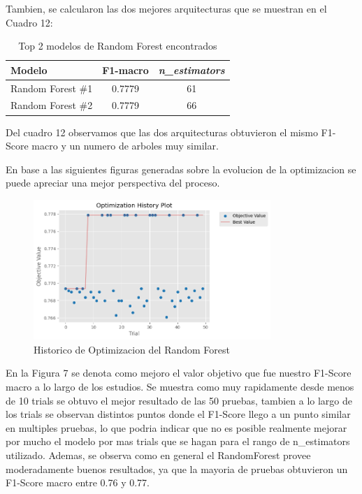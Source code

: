 \documentclass[12pt,a4paper]{article}
\begin{document}
Tambien, se calcularon las dos mejores arquitecturas que se muestran en el Cuadro 12:

\begin{table}[htbp]
  \centering
  \begin{tabular}{lcc}
    \hline
    Modelo & F1-macro & \textit{n\_estimators} \\
    \hline
    Random Forest \#1 & 0.7779 & 61 \\
    Random Forest \#2 & 0.7779 & 66 \\
    \hline
  \end{tabular}
  \caption{Top 2 modelos de Random Forest encontrados}
  \label{tab:optuna-rf-top2}
\end{table}

Del cuadro 12 observamos que las dos arquitecturas obtuvieron el mismo F1-Score macro y un numero de arboles muy similar.

En base a las siguientes figuras generadas sobre la evolucion de la optimizacion se puede apreciar una mejor
perspectiva del proceso.

\begin{figure}[H]
  \centering
  \includegraphics[width=0.8\textwidth]{../img/OptimizationHistoryDecisionForest.png}
  \caption{Historico de Optimizacion del Random Forest}\label{fig:optimization-random-forest}
\end{figure}

En la Figura 7 se denota como mejoro el valor objetivo que fue nuestro F1-Score macro a lo largo de los estudios.
Se muestra como muy rapidamente desde menos de 10 trials se obtuvo el mejor resultado de las 50 pruebas,
tambien a lo largo de los trials se observan distintos puntos donde el F1-Score llego a un punto similar en
multiples pruebas, lo que podria indicar que no es posible realmente mejorar por mucho el modelo
por mas trials que se hagan para el rango de n_estimators utilizado. Ademas, se observa como en general
el RandomForest provee moderadamente buenos resultados, ya que la mayoria de pruebas obtuvieron un F1-Score macro
entre 0.76 y 0.77.
\end{document}
